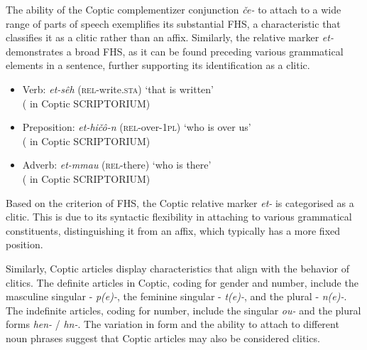 \documentclass[output=paper,colorlinks,citecolor=brown ,chinesefont]{langscibook}
\begin{document}
The ability of the Coptic complementizer conjunction  \textit{če-} to attach to a wide range of parts of speech exemplifies its substantial FHS, a characteristic that classifies it as a clitic rather than an affix.
Similarly, the relative marker  \textit{et-} demonstrates a broad FHS, as it can be found preceding various grammatical elements in a sentence, further supporting its identification as a clitic.

\begin{itemize}
    \item  Verb:  \textit{et-sêh} (\textsc{rel}-write.\textsc{sta}) ‘that is written' \\ ( in Coptic SCRIPTORIUM)
    \item Preposition:  \textit{et-hičô-n} (\textsc{rel}-over-1\textsc{pl}) ‘who is over us' \\( in Coptic SCRIPTORIUM)
    \item Adverb:  \textit{et-mmau} (\textsc{rel}-there) ‘who is there' \\ ( in Coptic SCRIPTORIUM)
\end{itemize}

Based on the criterion of FHS, the Coptic relative marker  \textit{et-} is categorised as a clitic. This is due to its syntactic flexibility in attaching to various grammatical constituents, distinguishing it from an affix, which typically has a more fixed position.


Similarly, Coptic articles display characteristics that align with the behavior of clitics. The definite articles in Coptic, coding for gender and number, include the masculine singular - \textit{p(e)-}, the feminine singular - \textit{t(e)-}, and the plural - \textit{n(e)-}. The indefinite articles, coding for number, include the singular  \textit{ou-} and the plural forms  \textit{hen-} /  \textit{hn-}. The variation in form and the ability to attach to different noun phrases suggest that Coptic articles may also be considered clitics.
\end{document}

